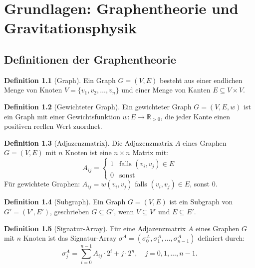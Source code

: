 ﻿\documentclass[a4paper,12pt]{report}
\theoremstyle{definition}
\newtheorem{definition}{Definition}
\begin{document}
\chapter{Grundlagen: Graphentheorie und Gravitationsphysik}

\section{Definitionen der Graphentheorie}

\begin{definition}[Graph]
Ein Graph $G = (V, E)$ besteht aus einer endlichen Menge von Knoten $V = \{v_1, v_2, \ldots, v_n\}$ und einer Menge von Kanten $E \subseteq V \times V$.
\end{definition}

\begin{definition}[Gewichteter Graph]
Ein gewichteter Graph $G = (V, E, w)$ ist ein Graph mit einer Gewichtsfunktion $w: E \to \mathbb{R}_{>0}$, die jeder Kante einen positiven reellen Wert zuordnet.
\end{definition}

\begin{definition}[Adjazenzmatrix]
Die Adjazenzmatrix $A$ eines Graphen $G = (V, E)$ mit $n$ Knoten ist eine $n \times n$ Matrix mit:
\[
A_{ij} = \begin{cases}
    1 & \text{falls } (v_i, v_j) \in E \\
    0 & \text{sonst}
\end{cases}
\]
Für gewichtete Graphen: $A_{ij} = w(v_i, v_j)$ falls $(v_i, v_j) \in E$, sonst $0$.
\end{definition}

\begin{definition}[Subgraph]
Ein Graph $G = (V, E)$ ist ein Subgraph von $G' = (V', E')$, geschrieben $G \subseteq G'$, wenn $V \subseteq V'$ und $E \subseteq E'$.
\end{definition}

\begin{definition}[Signatur-Array]
Für eine Adjazenzmatrix $A$ eines Graphen $G$ mit $n$ Knoten ist das Signatur-Array $\sigma^A = (\sigma^A_0, \sigma^A_1, \ldots, \sigma^A_{n-1})$ definiert durch:
\[
\sigma^A_j = \sum_{i=0}^{n-1} A_{ij} \cdot 2^i + j \cdot 2^n, \quad j = 0, 1, \ldots, n-1.
\]
\end{definition}
\end{document}
